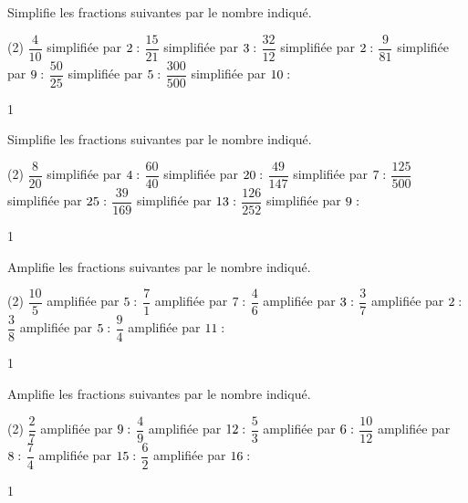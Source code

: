 \documentclass[a4paper,12pt]{report}
\begin{document}
\begin{exop}{
Simplifie les fractions suivantes par le nombre indiqué.
\begin{tasks}(2)
    \task $\dfrac{4}{10}$ simplifiée par $2: \hrulefill$
    \task $\dfrac{15}{21}$ simplifiée par $3: \hrulefill$
    \task $\dfrac{32}{12}$ simplifiée par $2: \hrulefill$
    \task $\dfrac{9}{81}$ simplifiée par $9: \hrulefill$
    \task $\dfrac{50}{25}$ simplifiée par $5: \hrulefill$
    \task $\dfrac{300}{500}$ simplifiée par $10: \hrulefill$
\end{tasks}
 \vspace{1pt}

}{1}\end{exop}

\begin{exop}{
Simplifie les fractions suivantes par le nombre indiqué.
\begin{tasks}(2)
    \task $\dfrac{8}{20}$ simplifiée par $4: \hrulefill$
    \task $\dfrac{60}{40}$ simplifiée par $20: \hrulefill$
    \task $\dfrac{49}{147}$ simplifiée par $7: \hrulefill$
    \task $\dfrac{125}{500}$ simplifiée par $25: \hrulefill$
    \task $\dfrac{39}{169}$ simplifiée par $13: \hrulefill$
    \task $\dfrac{126}{252}$ simplifiée par $9: \hrulefill$
\end{tasks}
 \vspace{1pt}

}{1}\end{exop}

\begin{exop}{
Amplifie les fractions suivantes par le nombre indiqué.
\begin{tasks}[after-item-skip = 0.5em, after-skip=-0.5em](2)
    \task $\dfrac{10}{5}$ amplifiée par $5: \hrulefill$
    \task $\dfrac{7}{1}$ amplifiée par $7: \hrulefill$
    \task $\dfrac{4}{6}$ amplifiée par $3: \hrulefill$
    \task $\dfrac{3}{7}$ amplifiée par $2: \hrulefill$
    \task $\dfrac{3}{8}$ amplifiée par $5: \hrulefill$
    \task $\dfrac{9}{4}$ amplifiée par $11: \hrulefill$
\end{tasks}
}{1}\end{exop}

\begin{exop}{
Amplifie les fractions suivantes par le nombre indiqué.
\begin{tasks}[after-item-skip = 0.5em, after-skip=-0.5em](2)
    \task $\dfrac{2}{7}$ amplifiée par $9: \hrulefill$
    \task $\dfrac{4}{9}$ amplifiée par $12: \hrulefill$
    \task $\dfrac{5}{3}$ amplifiée par $6: \hrulefill$
    \task $\dfrac{10}{12}$ amplifiée par $8: \hrulefill$
    \task $\dfrac{7}{4}$ amplifiée par $15: \hrulefill$
    \task $\dfrac{6}{2}$ amplifiée par $16: \hrulefill$
\end{tasks}
}{1}\end{exop}
\end{document}
